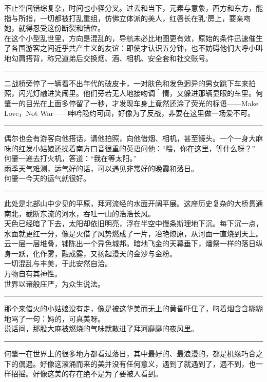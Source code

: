 \documentclass[oneside,11pt]{memoir} %
\begin{document}
\begin{CJK}{UTF8}{gbsn}
    不止空间错综复杂，时间也小径分叉。过去和当下，元素与意象，西方和东方，能指与所指，一切都被打乱重组，仿佛立体派的美人，红唇长在乳`房上，要亲吻她，就得忍受这份断裂和错位。\\\indent
     在这个小型乱世里，方向是混乱的，导航未必比地图更有效，原始的条件迅速催生了各国游客之间近乎共产主义的友谊：即使才认识五分钟，也不妨碍他们大呼小叫地勾肩搭背，称兄道弟后交换烟、酒、相机、安全套和社交账号。\\\indent
\rule{-3pt}{30pt}
    二战桥旁停了一辆看不出年代的破皮卡，一对肤色和发色迥异的男女跳下车来拍照，闪光灯融进笑闹里。他们旁若无人地接吻调｀情，又躲进那辆显眼的车里。何肇一的目光在上面多停留了一秒，才发现车身上竟然还涂了荧光的标语——Make Love，Not War——呻吟隐约可闻，好像为了反战，非要在这里做一场爱不可。\\\indent
\rule{-3pt}{30pt}
    偶尔也会有游客向他搭话，请他拍照，向他借烟、相机，甚至镜头。一个一身大麻味的红发小姑娘还操着南方口音很重的英语问他：“喂，你在这里，等什么呀？”\\\indent
    何肇一递去打火机，答道：“我在等太阳。”\\\indent
    雨季天气难测，运气好的话，可以遇见非常好的晚霞和落日。\\\indent
    何肇一今天的运气就很好。\\\indent
\rule{-3pt}{30pt}
    此处是北部山中少见的平原，拜河流经的水面开阔平展。这座历史复杂的大桥贯通南北，截断东流的河水，吞吐一山的浩浩长风。\\\indent
    天色已经暗了下去，太阳却依旧明亮，浮在半空中慢条斯理地下沉。每下沉一点，水面就更红一分，像是火借了风势燃成了一片，冶艳燎原，从河面一直烧到天上。云一层一层堆叠，铺陈出一个异色城邦。暗地飞金的天幕垂下，燔祭一样的落日纵身一跃，化作雾，融成露，又扬起漫天的金沙与金粉。\\\indent
    一切混乱与丰美，于此安然自洽。\\\indent
    万物自有其神性。\\\indent
    世界以诸般庄严，为众生说法。\\\indent
\rule{-3pt}{30pt}
    那个来借火的小姑娘没有走，像是被这华美而无上的黄昏吓住了，叼着烟含含糊糊地骂了一句：妈的，可真美呀。\\\indent
    说话间，那股大麻被燃烧的气味就散进了拜河靡靡的夜风里。\\\indent
\rule{-3pt}{30pt}
    何肇一在世界上的很多地方都看过落日，其中最好的、最浪漫的，都是机缘巧合之下的偶遇。好像这滚涌而来的美并没有任何意义，遇到了就遇到了，遇不到，也一样招摇。好像这美的存在绝不是为了要被人看到。\\\indent

\end{CJK}
\end{document}
